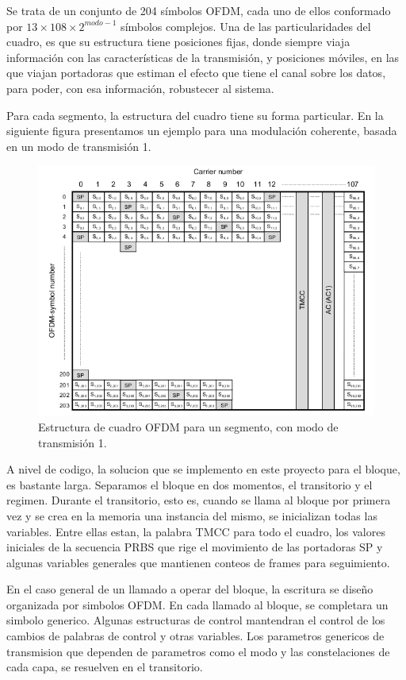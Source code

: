 Se trata de un conjunto de 204 s\'imbolos OFDM, cada uno de ellos conformado por $13 \times 108 \times 2^{modo -1}$ s\'imbolos complejos. Una de las particularidades del cuadro, es que su estructura tiene posiciones fijas, donde siempre viaja información con las características de la transmisión, y posiciones móviles, en las que viajan portadoras que estiman el efecto que tiene el canal sobre los datos, para poder, con esa información, robustecer al sistema. 

Para cada segmento, la estructura del cuadro tiene su forma particular. En la siguiente figura presentamos un ejemplo para una modulación coherente, basada en un modo de transmisión 1.

\begin{figure}[!h]
	\centering
	\includegraphics[scale=0.5]{figuras/cap05/ofdm_frame}
	\caption{\label{f:ofdm_frame} Estructura de cuadro OFDM para un segmento, con modo de transmisión 1.}
\end{figure}

A nivel de codigo, la solucion que se implemento en este proyecto para el bloque, es bastante larga. Separamos el bloque en dos momentos, el transitorio y el regimen. Durante el transitorio, esto es, cuando se llama al bloque por primera vez y se crea en la memoria una instancia del mismo, se inicializan todas las variables. Entre ellas estan, la palabra TMCC para todo el cuadro, los valores iniciales de la secuencia PRBS que rige el movimiento de las portadoras SP y algunas variables generales que mantienen conteos de frames para seguimiento. 

En el caso general de un llamado a operar del bloque, la escritura se diseño organizada por simbolos OFDM. En cada llamado al bloque, se completara un simbolo generico. Algunas estructuras de control mantendran el control de los cambios de palabras de control y otras variables. Los parametros genericos de transmision que dependen de parametros como el modo y las constelaciones de cada capa, se resuelven en el transitorio.

